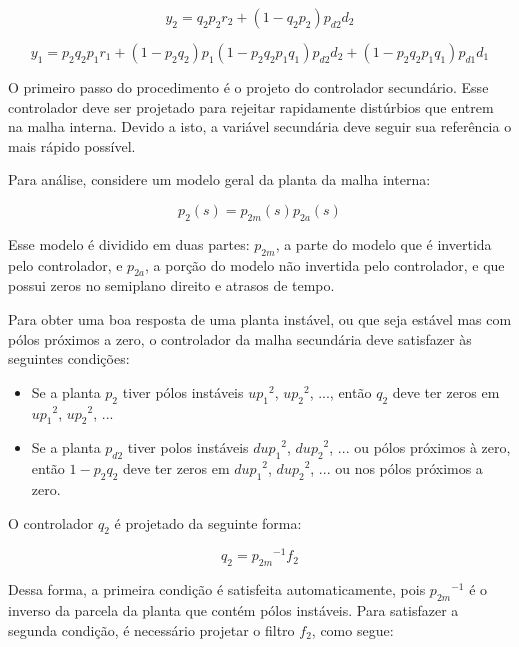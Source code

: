   \begin{equation}
    y_2 = q_2 p_2 r_2 + \left( 1- q_2 p_2 \right) p_{d2} d_2
  \end{equation}

  \begin{equation}
    y_1 = p_2 q_2 p_1 r_1 + \left( 1 - p_2 q_2 \right) p_1 \left(
      1 - p_2 q_2 p_1 q_1 \right) p_{d2} d_2 + \left( 1 - p_2 q_2 p_1 q_1
      \right) p_{d1} d_1
  \end{equation}

  O primeiro passo do procedimento é o projeto do controlador secundário. Esse controlador deve ser projetado para rejeitar rapidamente distúrbios que entrem na malha interna. Devido a isto, a variável secundária deve seguir sua referência o mais rápido possível.

  Para análise, considere um modelo geral da planta da malha interna:

  \begin{equation}
    p_2(s) = p_{2m}(s) p_{2a}(s)
  \end{equation}

  Esse modelo é dividido em duas partes: $p_{2m}$, a parte do modelo que é invertida pelo controlador, e $p_{2a}$, a porção do modelo não invertida pelo controlador, e que possui zeros no semiplano direito e atrasos de tempo.

  Para obter uma boa resposta de uma planta instável, ou que seja estável mas com pólos próximos a zero, o controlador da malha secundária deve satisfazer às seguintes condições:

  \begin{itemize}
    \item Se a planta $p_2$ tiver pólos instáveis
    	${up_1}^2$, ${up_2}^2$, ..., então $q_2$ deve ter zeros em
    	${up_1}^2$, ${up_2}^2$, ...
    \item Se a planta $p_{d2}$ tiver polos instáveis
    	${dup_1}^2$, ${dup_2}^2$, ... ou pólos próximos à zero, então
    	$1 - p_2 q_2$ deve ter zeros em ${dup_1}^2$, ${dup_2}^2$, ...
    	ou nos pólos próximos a zero.
  \end{itemize}

  O controlador $q_2$ é projetado da seguinte forma:

  \begin{equation}
    q_2 = {p_{2m}}^{-1} f_2
  \end{equation}

  Dessa forma, a primeira condição é satisfeita automaticamente, pois ${p_{2m}}^{-1}$ é o inverso da parcela da planta que contém pólos instáveis. Para satisfazer a segunda condição, é necessário projetar o filtro $f_2$, como segue:


